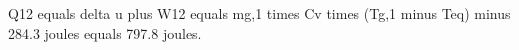 Q12 equals delta u plus W12 equals mg,1 times Cv times (Tg,1 minus Teq) minus 284.3 joules equals 797.8 joules.